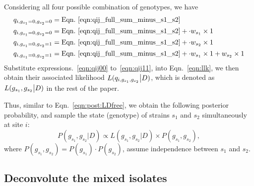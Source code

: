 \documentclass{bioinfo}
\begin{document}
Considering all four possible combination of genotypes, we have
\begin{align}
q_{i,g_{s_1}=0,g_{s_2}=0} & = \textrm{Eqn.~\eqref{eqn:qij_full_sum_minus_s1_s2}} \label{eqn:qij00}\\
q_{i,g_{s_1}=0,g_{s_2}=0} & = \textrm{Eqn.~\eqref{eqn:qij_full_sum_minus_s1_s2}} + \cdot w_{s_1} \times 1 \label{eqn:qij10}\\
q_{i,g_{s_1}=0,g_{s_2}=1} & = \textrm{Eqn.~\eqref{eqn:qij_full_sum_minus_s1_s2}} + \cdot w_{s_2} \times 1 \label{eqn:qij01}\\
q_{i,g_{s_1}=0,g_{s_2}=1} & = \textrm{Eqn.~\eqref{eqn:qij_full_sum_minus_s1_s2}} + \cdot w_{s_1} \times 1 + w_{s_2} \times 1 \label{eqn:qij11}
\end{align}
Substitute expressions.~\eqref{eqn:qij00} to~\eqref{eqn:qij11}, into Eqn.~\eqref{eqn:llk}, we then obtain their associated likelihood $L(q_{i,g_{s_1},g_{s_2}} \big{|} D)$, which is denoted as $L(g_{s_1},g_{s_2} \big{|} D)$ in the rest of the paper.

Thus, similar to Eqn.~\eqref{eqn:post:LDfree}, we obtain the following posterior probability, and sample the state (genotype) of strains $s_1$ and $s_2$ simultaneously at site $i$:
\begin{equation}
P(g_{s_1},g_{s_2} | D) \propto L(g_{s_1},g_{s_2} |D) \times P(g_{s_1},g_{s_2} ),\label{eqn:post.two:LDfree}
\end{equation}
where $P(g_{s_1},g_{s_2}) = P(g_{s_1}) \cdot P(g_{s_2})$, assume independence between $s_1$ and $s_2$. %




\subsection{Deconvolute the mixed isolates}\label{sec:method.deconv}
\end{document}

